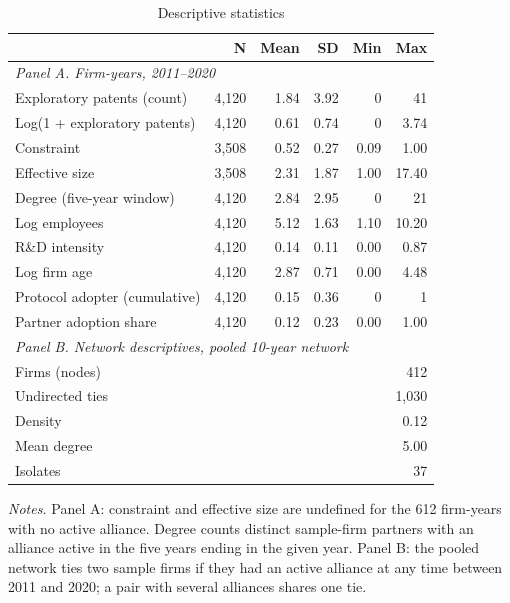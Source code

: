 \documentclass[12pt]{article}
\begin{document}
\begin{table}[!htbp]
\centering
\begin{threeparttable}
\caption{Descriptive statistics}
\label{tab:desc}
\small
\begin{tabular}{lrrrrr}
\toprule
 & N & Mean & SD & Min & Max \\
\midrule
\multicolumn{6}{l}{\textit{Panel A. Firm-years, 2011--2020}} \\
Exploratory patents (count) & 4,120 & 1.84 & 3.92 & 0 & 41 \\
Log(1 + exploratory patents) & 4,120 & 0.61 & 0.74 & 0 & 3.74 \\
Constraint & 3,508 & 0.52 & 0.27 & 0.09 & 1.00 \\
Effective size & 3,508 & 2.31 & 1.87 & 1.00 & 17.40 \\
Degree (five-year window) & 4,120 & 2.84 & 2.95 & 0 & 21 \\
Log employees & 4,120 & 5.12 & 1.63 & 1.10 & 10.20 \\
R\&D intensity & 4,120 & 0.14 & 0.11 & 0.00 & 0.87 \\
Log firm age & 4,120 & 2.87 & 0.71 & 0.00 & 4.48 \\
Protocol adopter (cumulative) & 4,120 & 0.15 & 0.36 & 0 & 1 \\
Partner adoption share & 4,120 & 0.12 & 0.23 & 0.00 & 1.00 \\
\midrule
\multicolumn{6}{l}{\textit{Panel B. Network descriptives, pooled 10-year network}} \\
Firms (nodes) & \multicolumn{5}{r}{412} \\
Undirected ties & \multicolumn{5}{r}{1,030} \\
Density & \multicolumn{5}{r}{0.12} \\
Mean degree & \multicolumn{5}{r}{5.00} \\
Isolates & \multicolumn{5}{r}{37} \\
\bottomrule
\end{tabular}
\begin{tablenotes}
\footnotesize
\item \textit{Notes.} Panel A: constraint and effective size are undefined for the 612 firm-years with no active alliance. Degree counts distinct sample-firm partners with an alliance active in the five years ending in the given year. Panel B: the pooled network ties two sample firms if they had an active alliance at any time between 2011 and 2020; a pair with several alliances shares one tie.
\end{tablenotes}
\end{threeparttable}
\end{table}
\end{document}
